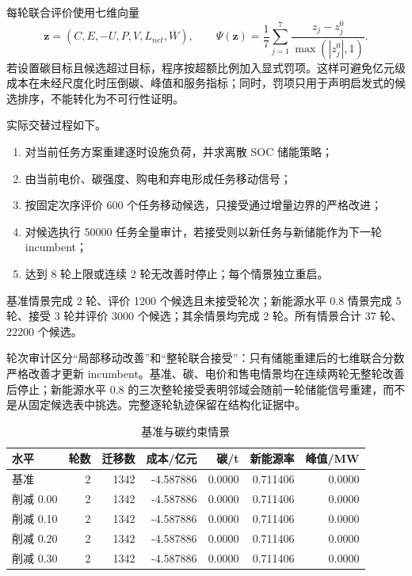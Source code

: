 每轮联合评价使用七维向量
\begin{equation}
\mathbf z=(C,E,-U,P,V,L_{net},\overline W),
\qquad
\Psi(\mathbf z)=\frac{1}{7}\sum_{j=1}^{7}\frac{z_j-z_j^0}{\max(|z_j^0|,1)}.
\end{equation}
若设置碳目标且候选超过目标，程序按超额比例加入显式罚项。这样可避免亿元级成本在未经尺度化时压倒碳、峰值和服务指标；同时，罚项只用于声明启发式的候选排序，不能转化为不可行性证明。

实际交替过程如下。
\begin{enumerate}
\item 对当前任务方案重建逐时设施负荷，并求离散 SOC 储能策略；
\item 由当前电价、碳强度、购电和弃电形成任务移动信号；
\item 按固定次序评价 600 个任务移动候选，只接受通过增量边界的严格改进；
\item 对候选执行 50000 任务全量审计，若接受则以新任务与新储能作为下一轮 incumbent；
\item 达到 8 轮上限或连续 2 轮无改善时停止；每个情景独立重启。
\end{enumerate}

基准情景完成 2 轮、评价 1200 个候选且未接受轮次；新能源水平 0.8 情景完成 5 轮、接受 3 轮并评价 3000 个候选；其余情景均完成 2 轮。所有情景合计 37 轮、22200 个候选。


轮次审计区分“局部移动改善”和“整轮联合接受”：只有储能重建后的七维联合分数严格改善才更新 incumbent。基准、碳、电价和售电情景均在连续两轮无整轮改善后停止；新能源水平 0.8 的三次整轮接受表明邻域会随前一轮储能信号重建，而不是从固定候选表中挑选。完整逐轮轨迹保留在结构化证据中。

\begin{table}[H]\centering
{\small
\caption{基准与碳约束情景}\label{tab:q4scenarios}
\begin{tabular}{lrrrrrr}\toprule
水平 & 轮数 & 迁移数 & 成本/亿元 & 碳/t & 新能源率 & 峰值/MW\\\midrule
基准 & 2 & 1342 & -4.587886 & 0.0000 & 0.711406 & 0.0000\\
削减 0.00 & 2 & 1342 & -4.587886 & 0.0000 & 0.711406 & 0.0000\\
削减 0.10 & 2 & 1342 & -4.587886 & 0.0000 & 0.711406 & 0.0000\\
削减 0.20 & 2 & 1342 & -4.587886 & 0.0000 & 0.711406 & 0.0000\\
削减 0.30 & 2 & 1342 & -4.587886 & 0.0000 & 0.711406 & 0.0000\\\bottomrule
\end{tabular}
}
\end{table}

